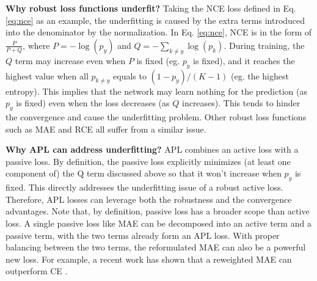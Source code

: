 \documentclass{article}
\begin{document}
\noindent\textbf{Why robust loss functions underfit?}
Taking the NCE loss defined in Eq. \eqref{eq:nce} as an example, the underfitting is caused by the extra terms introduced into the denominator by the normalization. In Eq. \eqref{eq:nce}, NCE is in the form of $\frac{P}{P+Q}$, where $P=-\log(p_y)$ and $Q=-\sum_{k \neq y}\log(p_k)$. During training, the $Q$ term may increase even when $P$ is fixed (eg. $p_y$ is fixed), and it reaches the highest value when all $p_{k \neq y}$ equals to $(1-p_y)/(K-1)$ (eg. the highest entropy). This implies that the network may learn nothing for the prediction (as $p_y$ is fixed) even when the loss decreases (as $Q$ increases). This tends to hinder the convergence and cause the underfitting problem. Other robust loss functions such as MAE and RCE all suffer from a similar issue.

\noindent\textbf{Why APL can address underfitting?}
APL combines an active loss with a passive loss. By definition, the passive loss explicitly minimizes (at least one component of) the Q term discussed above so that it won’t increase when $p_y$ is fixed. This directly addresses the underfitting issue of a robust active loss. Therefore, APL losses can leverage both the robustness and the convergence advantages.
Note that, by definition, passive loss has a broader scope than active loss. A single passive loss like MAE can be decomposed into an active term and a passive term, with the two terms already form an APL loss. With proper balancing between the two terms, the reformulated MAE can also be a powerful new loss. For example, a recent work has shown that a reweighted MAE can outperform CE \cite{wang2019imae}.
\end{document}
